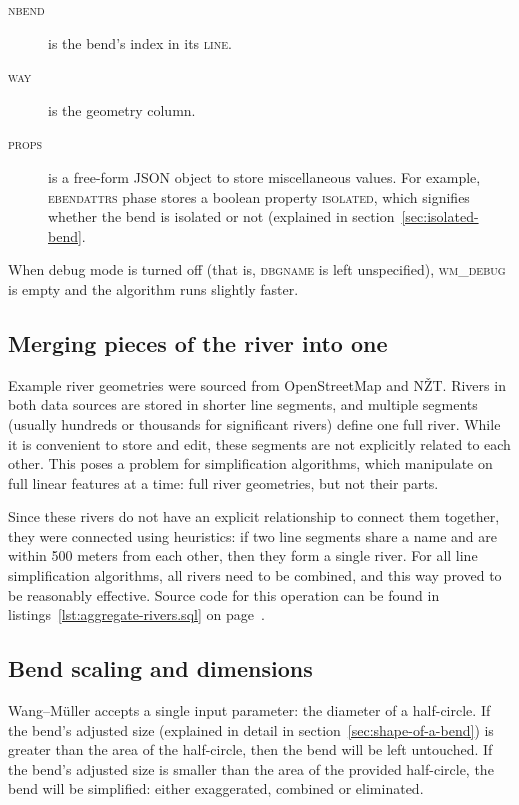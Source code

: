 \documentclass[a4paper]{article}
\newcommand{\onpage}[1]{\ref{#1} on page~\pageref{#1}}
\newcommand{\WM}{Wang--M{\"u}ller}
\begin{document}
\begin{description}
    \item[\normalfont\textsc{nbend}] is the bend's index in its \textsc{line}.

    \item[\normalfont\textsc{way}] is the geometry column.

    \item[\normalfont\textsc{props}] is a free-form JSON object to store
        miscellaneous values. For example, \textsc{ebendattrs} phase stores a
        boolean property \textsc{isolated}, which signifies whether the bend is
        isolated or not (explained in section~\ref{sec:isolated-bend}.

\end{description}

When debug mode is turned off (that is, \textsc{dbgname} is left unspecified),
\textsc{wm\_debug} is empty and the algorithm runs slightly faster.

\subsection{Merging pieces of the river into one}

Example river geometries were sourced from OpenStreetMap\cite{openstreetmap}
and NŽT\cite{nzt}. Rivers in both data sources are stored in shorter line
segments, and multiple segments (usually hundreds or thousands for significant
rivers) define one full river. While it is convenient to store and edit, these
segments are not explicitly related to each other. This poses a problem for
simplification algorithms, which manipulate on full linear features at a time:
full river geometries, but not their parts.

Since these rivers do not have an explicit relationship to connect them
together, they were connected using heuristics: if two line segments share a
name and are within 500 meters from each other, then they form a single river.
For all line simplification algorithms, all rivers need to be combined, and
this way proved to be reasonably effective. Source code for this operation can
be found in listings~\onpage{lst:aggregate-rivers.sql}.

\subsection{Bend scaling and dimensions}
\label{sec:bend-scaling-and-dimensions}

{\WM} accepts a single input parameter: the diameter of a half-circle. If the
bend's adjusted size (explained in detail in section~\ref{sec:shape-of-a-bend})
is greater than the area of the half-circle, then the bend will be left
untouched. If the bend's adjusted size is smaller than the area of the provided
half-circle, the bend will be simplified: either exaggerated, combined or
eliminated.
\end{document}
